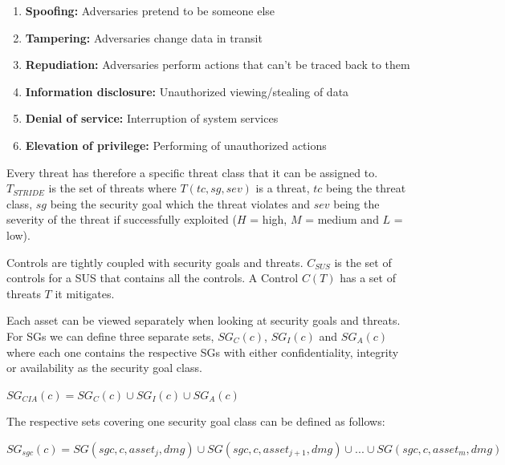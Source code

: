 \begin{enumerate}
\item[]\textbf{Spoofing:} Adversaries pretend to be someone else
\item[]\textbf{Tampering:} Adversaries change data in transit
\item[]\textbf{Repudiation:} Adversaries perform actions that can't be traced back to them
\item[]\textbf{Information disclosure:} Unauthorized viewing/stealing of data
\item[]\textbf{Denial of service:} Interruption of system services
\item[]\textbf{Elevation of privilege:} Performing of unauthorized actions
\end{enumerate}

Every threat has therefore a specific threat class that it can be assigned to. $T_{STRIDE}$ is the set of threats where $T(tc, sg, sev)$ is a threat, $tc$ being the threat class, $sg$ being the security goal which the threat violates and $sev$ being the severity of the threat if successfully exploited ($H$ = high, $M$ = medium and $L$ = low). 

Controls are tightly coupled with security goals and threats. $C_{SUS}$ is the set of controls for a SUS that contains all the controls. A Control $C(T)$ has a set of threats $T$ it mitigates.

Each asset can be viewed separately when looking at security goals and threats. For SGs we can define three separate sets, $SG_C(c)$, $SG_I(c)$ and $SG_A(c)$ where each one contains the respective SGs with either confidentiality, integrity or availability as the security goal class.

\begin{theorem}
$SG_{CIA}(c) = SG_C(c) \cup SG_I(c) \cup SG_A(c)$
\end{theorem}

The respective sets covering one security goal class can be defined as follows:

\begin{theorem}
$SG_{sgc}(c) = SG(sgc, c, asset_j, dmg) \cup SG(sgc, c, asset_{j+1}, dmg)  \cup ... \cup SG(sgc, c, asset_m, dmg) $
\end{theorem}

